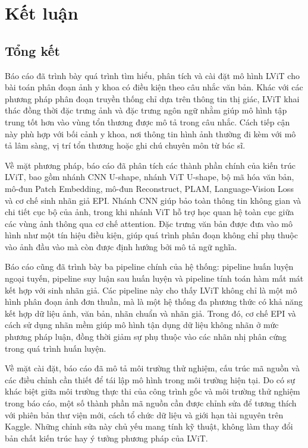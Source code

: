 \chapter{Kết luận}
\label{Chapter5}
\setcounter{secnumdepth}{5}

\section{Tổng kết}

Báo cáo đã trình bày quá trình tìm hiểu, phân tích và cài đặt mô hình LViT cho bài toán phân đoạn ảnh y khoa có điều kiện theo câu nhắc văn bản. Khác với các phương pháp phân đoạn truyền thống chỉ dựa trên thông tin thị giác, LViT khai thác đồng thời đặc trưng ảnh và đặc trưng ngôn ngữ nhằm giúp mô hình tập trung tốt hơn vào vùng tổn thương được mô tả trong câu nhắc. Cách tiếp cận này phù hợp với bối cảnh y khoa, nơi thông tin hình ảnh thường đi kèm với mô tả lâm sàng, vị trí tổn thương hoặc ghi chú chuyên môn từ bác sĩ.

Về mặt phương pháp, báo cáo đã phân tích các thành phần chính của kiến trúc LViT, bao gồm nhánh CNN U-shape, nhánh ViT U-shape, bộ mã hóa văn bản, mô-đun Patch Embedding, mô-đun Reconstruct, PLAM, Language-Vision Loss và cơ chế sinh nhãn giả EPI. Nhánh CNN giúp bảo toàn thông tin không gian và chi tiết cục bộ của ảnh, trong khi nhánh ViT hỗ trợ học quan hệ toàn cục giữa các vùng ảnh thông qua cơ chế attention. Đặc trưng văn bản được đưa vào mô hình như một tín hiệu điều kiện, giúp quá trình phân đoạn không chỉ phụ thuộc vào ảnh đầu vào mà còn được định hướng bởi mô tả ngữ nghĩa.

Báo cáo cũng đã trình bày ba pipeline chính của hệ thống: pipeline huấn luyện ngoại tuyến, pipeline suy luận sau huấn luyện và pipeline tính toán hàm mất mát kết hợp với sinh nhãn giả. Các pipeline này cho thấy LViT không chỉ là một mô hình phân đoạn ảnh đơn thuần, mà là một hệ thống đa phương thức có khả năng kết hợp dữ liệu ảnh, văn bản, nhãn chuẩn và nhãn giả. Trong đó, cơ chế EPI và cách sử dụng nhãn mềm giúp mô hình tận dụng dữ liệu không nhãn ở mức phương pháp luận, đồng thời giảm sự phụ thuộc vào các nhãn nhị phân cứng trong quá trình huấn luyện.

Về mặt cài đặt, báo cáo đã mô tả môi trường thử nghiệm, cấu trúc mã nguồn và các điều chỉnh cần thiết để tái lập mô hình trong môi trường hiện tại. Do có sự khác biệt giữa môi trường thực thi của công trình gốc và môi trường thử nghiệm trong báo cáo, một số thành phần mã nguồn cần được chỉnh sửa để tương thích với phiên bản thư viện mới, cách tổ chức dữ liệu và giới hạn tài nguyên trên Kaggle. Những chỉnh sửa này chủ yếu mang tính kỹ thuật, không làm thay đổi bản chất kiến trúc hay ý tưởng phương pháp của LViT.

